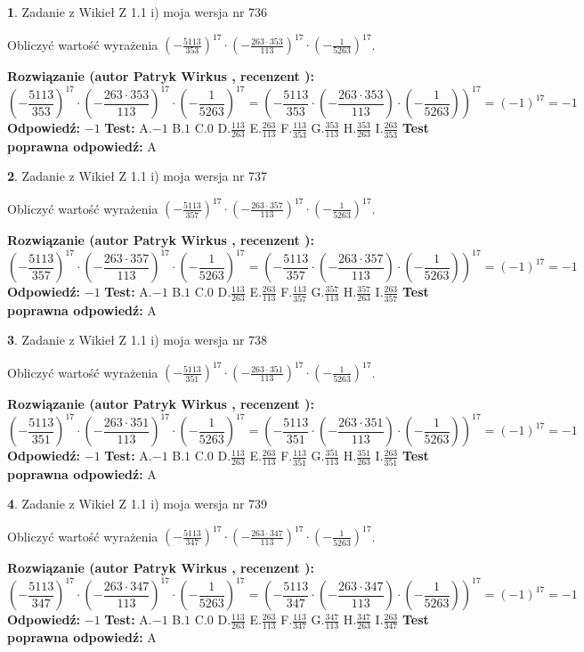 \documentclass[12pt, a4paper]{article}
\theoremstyle{definition} %
\newtheorem{zad}{}
\newcommand{\zadStart}[1]{\begin{zad}#1\newline}
\newcommand{\zadStop}{\end{zad}}
\newcommand{\rozwStart}[2]{\noindent \textbf{Rozwiązanie (autor #1 , recenzent #2): }\newline}
\newcommand{\rozwStop}{\newline}
\newcommand{\odpStart}{\noindent \textbf{Odpowiedź:}\newline}
\newcommand{\odpStop}{\newline}
\newcommand{\testStart}{\noindent \textbf{Test:}\newline}
\newcommand{\testStop}{\newline}
\newcommand{\kluczStart}{\noindent \textbf{Test poprawna odpowiedź:}\newline}
\newcommand{\kluczStop}{\newline}
\begin{document}
\zadStart{Zadanie z Wikieł Z 1.1 i) moja wersja nr 736}

Obliczyć wartość wyrażenia $(-\frac{5113}{353})^{17} \cdot (-\frac{263 \cdot 353}{113})^{17} \cdot (-\frac{1}{5263})^{17}$.
\zadStop
\rozwStart{Patryk Wirkus}{}
$$(-\frac{5113}{353})^{17} \cdot (-\frac{263 \cdot 353}{113})^{17} \cdot (-\frac{1}{5263})^{17} = (-\frac{5113}{353} \cdot (-\frac{263 \cdot 353}{113}) \cdot (-\frac{1}{5263}))^{17} = (-1)^{17} = -1$$
\rozwStop
\odpStart
$-1$
\odpStop
\testStart
A.$-1$ B.$1$ C.$0$ D.$\frac{113}{263}$ E.$\frac{263}{113}$
F.$\frac{113}{353}$ G.$\frac{353}{113}$
H.$\frac{353}{263}$
I.$\frac{263}{353}$
\testStop
\kluczStart
A
\kluczStop



\zadStart{Zadanie z Wikieł Z 1.1 i) moja wersja nr 737}

Obliczyć wartość wyrażenia $(-\frac{5113}{357})^{17} \cdot (-\frac{263 \cdot 357}{113})^{17} \cdot (-\frac{1}{5263})^{17}$.
\zadStop
\rozwStart{Patryk Wirkus}{}
$$(-\frac{5113}{357})^{17} \cdot (-\frac{263 \cdot 357}{113})^{17} \cdot (-\frac{1}{5263})^{17} = (-\frac{5113}{357} \cdot (-\frac{263 \cdot 357}{113}) \cdot (-\frac{1}{5263}))^{17} = (-1)^{17} = -1$$
\rozwStop
\odpStart
$-1$
\odpStop
\testStart
A.$-1$ B.$1$ C.$0$ D.$\frac{113}{263}$ E.$\frac{263}{113}$
F.$\frac{113}{357}$ G.$\frac{357}{113}$
H.$\frac{357}{263}$
I.$\frac{263}{357}$
\testStop
\kluczStart
A
\kluczStop



\zadStart{Zadanie z Wikieł Z 1.1 i) moja wersja nr 738}

Obliczyć wartość wyrażenia $(-\frac{5113}{351})^{17} \cdot (-\frac{263 \cdot 351}{113})^{17} \cdot (-\frac{1}{5263})^{17}$.
\zadStop
\rozwStart{Patryk Wirkus}{}
$$(-\frac{5113}{351})^{17} \cdot (-\frac{263 \cdot 351}{113})^{17} \cdot (-\frac{1}{5263})^{17} = (-\frac{5113}{351} \cdot (-\frac{263 \cdot 351}{113}) \cdot (-\frac{1}{5263}))^{17} = (-1)^{17} = -1$$
\rozwStop
\odpStart
$-1$
\odpStop
\testStart
A.$-1$ B.$1$ C.$0$ D.$\frac{113}{263}$ E.$\frac{263}{113}$
F.$\frac{113}{351}$ G.$\frac{351}{113}$
H.$\frac{351}{263}$
I.$\frac{263}{351}$
\testStop
\kluczStart
A
\kluczStop



\zadStart{Zadanie z Wikieł Z 1.1 i) moja wersja nr 739}

Obliczyć wartość wyrażenia $(-\frac{5113}{347})^{17} \cdot (-\frac{263 \cdot 347}{113})^{17} \cdot (-\frac{1}{5263})^{17}$.
\zadStop
\rozwStart{Patryk Wirkus}{}
$$(-\frac{5113}{347})^{17} \cdot (-\frac{263 \cdot 347}{113})^{17} \cdot (-\frac{1}{5263})^{17} = (-\frac{5113}{347} \cdot (-\frac{263 \cdot 347}{113}) \cdot (-\frac{1}{5263}))^{17} = (-1)^{17} = -1$$
\rozwStop
\odpStart
$-1$
\odpStop
\testStart
A.$-1$ B.$1$ C.$0$ D.$\frac{113}{263}$ E.$\frac{263}{113}$
F.$\frac{113}{347}$ G.$\frac{347}{113}$
H.$\frac{347}{263}$
I.$\frac{263}{347}$
\testStop
\kluczStart
A
\kluczStop
\end{document}
